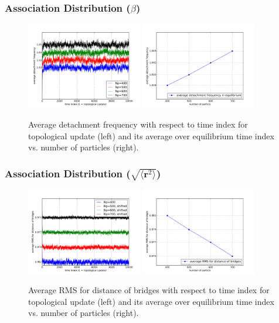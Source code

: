 \documentclass[slidestop, compress, mathserif]{beamer}
\begin{document}
\begin{frame}
  \frametitle<presentation>{Association Distribution ($\beta$)}
  \begin{figure}
    \centering
    \includegraphics[width=0.45\textwidth]{../dist_beta_spectrum.pdf}
    \includegraphics[width=0.45\textwidth]{../dist_beta.pdf}
    \caption{Average detachment frequency with respect to time index for topological update (left) and its average over equilibrium time index vs. number of particles (right).}
  \end{figure}
\end{frame}

\begin{frame}
  \frametitle<presentation>{Association Distribution ($\sqrt{\langle \mathbf{r}^2\rangle}$)}
  \begin{figure}
    \centering
    \includegraphics[width=0.45\textwidth]{../dist_Rrms_spectrum.pdf}
    \includegraphics[width=0.45\textwidth]{../dist_Rrms.pdf}
    \caption{Average RMS for distance of bridges with respect to time index for topological update (left) and its average over equilibrium time index vs. number of particles (right).}
  \end{figure}

\end{frame}
\end{document}

